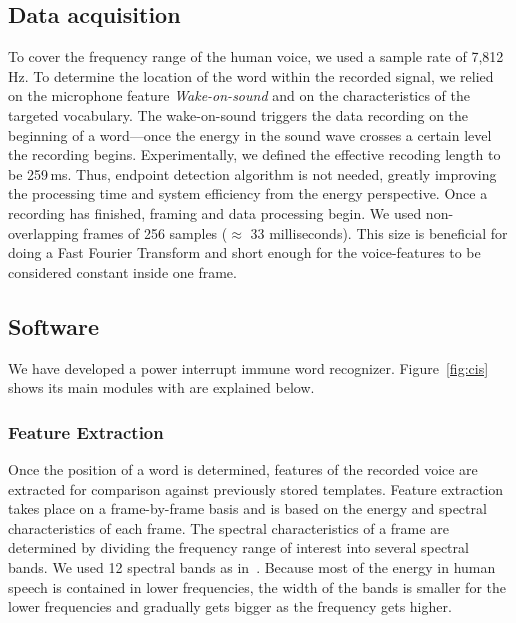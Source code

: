 \subsection{Data acquisition}
To cover the frequency range of the human voice, we used a sample rate of 7,812 Hz. To determine the location of the word within the recorded signal, we relied on the microphone feature  \textit{Wake-on-sound} and on the characteristics of the targeted vocabulary. The wake-on-sound triggers the data recording on the beginning of a word---once the energy in the sound wave crosses a certain level the recording begins. Experimentally, we defined the effective recoding length to be 259\,ms. Thus, endpoint detection algorithm is not needed, greatly improving the processing time and system efficiency from the energy perspective. Once a recording has finished, framing and data processing begin. We used non-overlapping frames of 256 samples ($\approx$ 33 milliseconds). This size is beneficial for doing a Fast Fourier Transform and short enough for the voice-features to be considered constant inside one frame.


\subsection{Software}
We have developed a power interrupt immune word recognizer. Figure~\ref{fig:cis} shows its main modules with are explained below. 

\subsubsection{Feature Extraction}
Once the position of a word is determined, features of the recorded voice are extracted for comparison against previously stored templates. Feature extraction takes place on a frame-by-frame basis and is based on the energy and spectral characteristics of each frame. The spectral characteristics of a frame are determined by dividing the frequency range of interest into several spectral bands. We used 12 spectral bands as in~\cite{Hopper1992}. %
Because most of the energy in human speech is contained in lower frequencies, the width of the bands is smaller for the lower frequencies and gradually gets bigger as the frequency gets higher.

